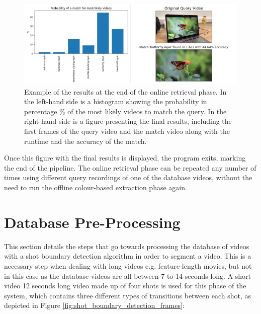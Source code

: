 \begin{figure}[h] 
\centerline{\includegraphics[width=\textwidth]{figures/implementation/online-retrieval-results.png}}
\caption{\label{fig:implementation-online-retrieval-results}Example of the results at the end of the online retrieval phase. In the left-hand side is a histogram showing the probability in percentage \% of the most likely videos to match the query. In the right-hand side is a figure presenting the final results, including the first frames of the query video and the match video along with the runtime and the accuracy of the match.}
\end{figure}

Once this figure with the final results is displayed, the program exits, marking the end of the pipeline. The online retrieval phase can be repeated any number of times using different query recordings of one of the database videos, without the need to run the offline colour-based extraction phase again.


\section{Database Pre-Processing}
\label{sec:database-pre-processing}

This section details the steps that go towards processing the database of videos with a shot boundary detection algorithm in order to segment a video. This is a necessary step when dealing with long videos e.g. feature-length movies, but not in this case as the database videos are all between 7 to 14 seconds long. A short video 12 seconds long video made up of four shots is used for this phase of the system, which contains three different types of transitions between each shot, as depicted in Figure \ref{fig:shot_boundary_detection_frames}:

